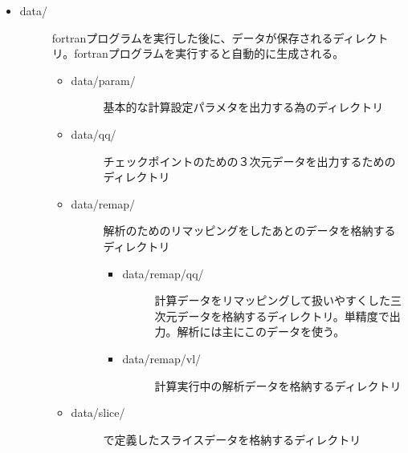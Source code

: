 \documentclass[letterpaper,10pt,dvipdfmx,report]{sphinxmanual}
\begin{document}
\begin{itemize}
\item {} \begin{description}
\item[{data/}] \leavevmode
fortranプログラムを実行した後に、データが保存されるディレクトリ。fortranプログラムを実行すると自動的に生成される。
\begin{itemize}
\item {} \begin{description}
\item[{data/param/}] \leavevmode
基本的な計算設定パラメタを出力する為のディレクトリ

\end{description}

\item {} \begin{description}
\item[{data/qq/}] \leavevmode
チェックポイントのための３次元データを出力するためのディレクトリ

\end{description}

\item {} \begin{description}
\item[{data/remap/}] \leavevmode
解析のためのリマッピングをしたあとのデータを格納するディレクトリ
\begin{itemize}
\item {} \begin{description}
\item[{data/remap/qq/}] \leavevmode
計算データをリマッピングして扱いやすくした三次元データを格納するディレクトリ。単精度で出力。解析には主にこのデータを使う。

\end{description}

\item {} \begin{description}
\item[{data/remap/vl/}] \leavevmode
計算実行中の解析データを格納するディレクトリ

\end{description}

\end{itemize}

\end{description}

\item {} \begin{description}
\item[{data/slice/}] \leavevmode
{} で定義したスライスデータを格納するディレクトリ


\end{description}
\end{itemize}
\end{description}
\end{itemize}
\end{document}
